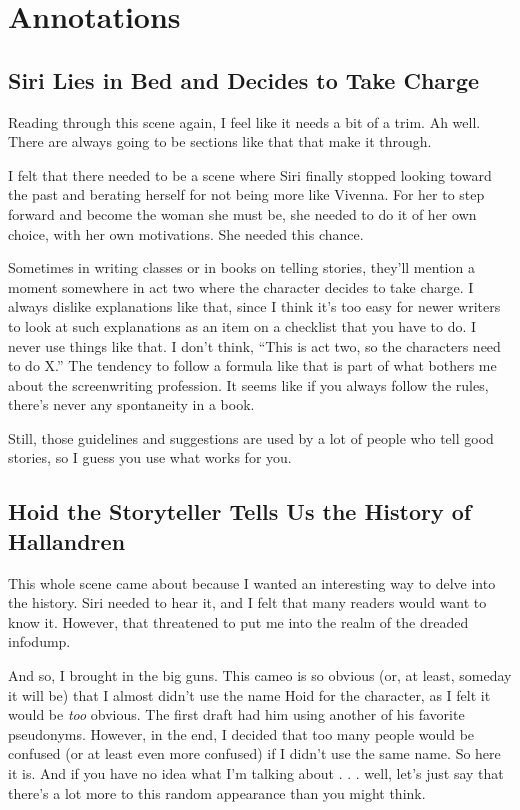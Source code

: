 \section*{Annotations}

\subsection*{Siri Lies in Bed and Decides to Take Charge}

Reading through this scene again, I feel like it needs a bit of a trim. Ah well. There are always going to be sections like that that make it through.

I felt that there needed to be a scene where Siri finally stopped looking toward the past and berating herself for not being more like Vivenna. For her to step forward and become the woman she must be, she needed to do it of her own choice, with her own motivations. She needed this chance.

Sometimes in writing classes or in books on telling stories, they’ll mention a moment somewhere in act two where the character decides to take charge. I always dislike explanations like that, since I think it’s too easy for newer writers to look at such explanations as an item on a checklist that you have to do. I never use things like that. I don’t think, “This is act two, so the characters need to do X.” The tendency to follow a formula like that is part of what bothers me about the screenwriting profession. It seems like if you always follow the rules, there’s never any spontaneity in a book.

Still, those guidelines and suggestions are used by a lot of people who tell good stories, so I guess you use what works for you.

\subsection*{Hoid the Storyteller Tells Us the History of Hallandren}

This whole scene came about because I wanted an interesting way to delve into the history. Siri needed to hear it, and I felt that many readers would want to know it. However, that threatened to put me into the realm of the dreaded infodump.

And so, I brought in the big guns. This cameo is so obvious (or, at least, someday it will be) that I almost didn’t use the name Hoid for the character, as I felt it would be \textit{too} obvious. The first draft had him using another of his favorite pseudonyms. However, in the end, I decided that too many people would be confused (or at least even more confused) if I didn’t use the same name. So here it is. And if you have no idea what I’m talking about . . . well, let’s just say that there’s a lot more to this random appearance than you might think.

